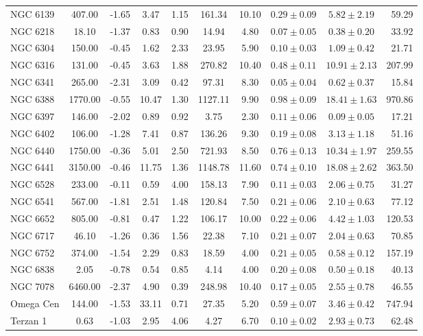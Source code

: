 \documentclass[doublespace,draft,nopageskip]{VTthesis} %
\begin{document}
\begin{table}
\begin{threeparttable}
\begin{tabular}{lccccccccr}
NGC 6139 & 407.00 & -1.65 & 3.47 & 1.15 & 161.34 & 10.10 & $0.29 \pm 0.09$ & $5.82 \pm 2.19$ & 59.29\\
NGC 6218 & 18.10 & -1.37 & 0.83 & 0.90 & 14.94 & 4.80 & $0.07 \pm 0.05$ & $0.38 \pm 0.20$ & 33.92\\
NGC 6304 & 150.00 & -0.45 & 1.62 & 2.33 & 23.95 & 5.90 & $0.10 \pm 0.03$ & $1.09 \pm 0.42$ & 21.71\\
NGC 6316 & 131.00 & -0.45 & 3.63 & 1.88 & 270.82 & 10.40 & $0.48 \pm 0.11$ & $10.91 \pm 2.13$ & 207.99\\
NGC 6341 & 265.00 & -2.31 & 3.09 & 0.42 & 97.31 & 8.30 & $0.05 \pm 0.04$ & $0.62 \pm 0.37$ & 15.84\\
NGC 6388 & 1770.00 & -0.55 & 10.47 & 1.30 & 1127.11 & 9.90 & $0.98 \pm 0.09$ & $18.41 \pm 1.63$ & 970.86\\
NGC 6397 & 146.00 & -2.02 & 0.89 & 0.92 & 3.75 & 2.30 & $0.11 \pm 0.06$ & $0.09 \pm 0.05$ & 17.21\\
NGC 6402 & 106.00 & -1.28 & 7.41 & 0.87 & 136.26 & 9.30 & $0.19 \pm 0.08$ & $3.13 \pm 1.18$ & 51.16\\
NGC 6440 & 1750.00 & -0.36 & 5.01 & 2.50 & 721.93 & 8.50 & $0.76 \pm 0.13$ & $10.34 \pm 1.97$ & 259.55\\
NGC 6441 & 3150.00 & -0.46 & 11.75 & 1.36 & 1148.78 & 11.60 & $0.74 \pm 0.10$ & $18.08 \pm 2.62$ & 363.50\\
NGC 6528 & 233.00 & -0.11 & 0.59 & 4.00 & 158.13 & 7.90 & $0.11 \pm 0.03$ & $2.06 \pm 0.75$ & 31.27\\
NGC 6541 & 567.00 & -1.81 & 2.51 & 1.48 & 120.84 & 7.50 & $0.21 \pm 0.06$ & $2.10 \pm 0.63$ & 77.12\\
NGC 6652 & 805.00 & -0.81 & 0.47 & 1.22 & 106.17 & 10.00 & $0.22 \pm 0.06$ & $4.42 \pm 1.03$ & 120.53\\
NGC 6717 & 46.10 & -1.26 & 0.36 & 1.56 & 22.38 & 7.10 & $0.21 \pm 0.07$ & $2.04 \pm 0.63$ & 70.85\\
NGC 6752 & 374.00 & -1.54 & 2.29 & 0.83 & 18.59 & 4.00 & $0.21 \pm 0.05$ & $0.58 \pm 0.12$ & 157.19\\
NGC 6838 & 2.05 & -0.78 & 0.54 & 0.85 & 4.14 & 4.00 & $0.20 \pm 0.08$ & $0.50 \pm 0.18$ & 40.13\\
NGC 7078 & 6460.00 & -2.37 & 4.90 & 0.39 & 248.98 & 10.40 & $0.17 \pm 0.05$ & $2.55 \pm 0.78$ & 46.55\\
Omega Cen & 144.00 & -1.53 & 33.11 & 0.71 & 27.35 & 5.20 & $0.59 \pm 0.07$ & $3.46 \pm 0.42$ & 747.94\\
Terzan 1 & 0.63 & -1.03 & 2.95 & 4.06 & 4.27 & 6.70 & $0.10 \pm 0.02$ & $2.93 \pm 0.73$ & 62.48\\

\end{tabular}
\end{threeparttable}
\end{table}
\end{document}
